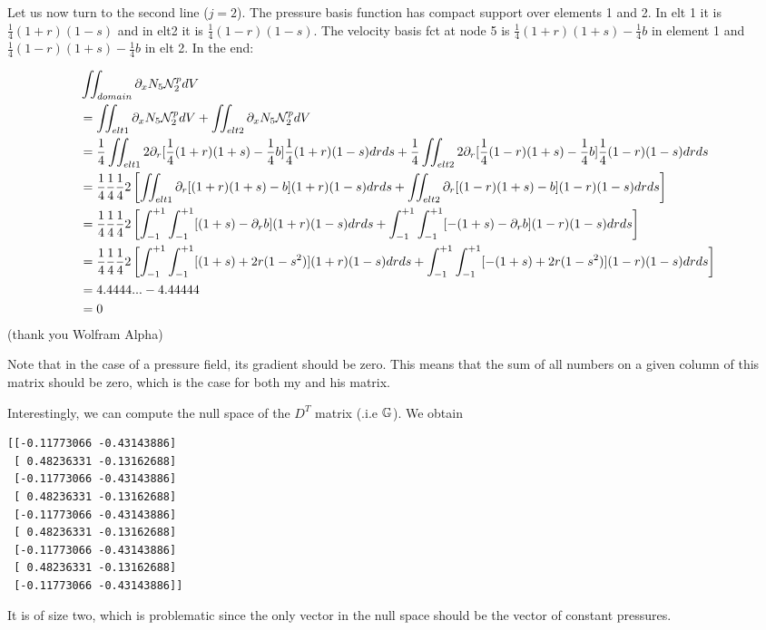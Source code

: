 Let us now turn to the second line ($j=2$). The pressure basis function has compact support
over elements 1 and 2. In elt 1 it is $\frac14(1+r)(1-s)$ and in elt2 it is $\frac14(1-r)(1-s)$.
The velocity basis fct at node 5 is $\frac14(1+r)(1+s)-\frac14 b$ in element 1 and 
$\frac14(1-r)(1+s) -\frac14 b$ in elt 2. In the end:

\begin{align}
&\iint_{domain} \partial_x N_5 {\mathcal{N}}_2^p dV \nonumber\\
&= \iint_{elt1} \partial_x N_5 {\mathcal{N}}_2^p dV + \iint_{elt2} \partial_x N_5 {\mathcal{N}}_2^p dV \nonumber\\
&= 
\frac14 \iint_{elt1} 2\partial_r [\frac14(1+r)(1+s)-\frac14 b] \frac14(1+r)(1-s) drds +
\frac14 \iint_{elt2} 2\partial_r [\frac14(1-r)(1+s)-\frac14 b] \frac14(1-r)(1-s) drds \nonumber\\
&=
\frac14\frac14\frac14 2 
\left[ 
\iint_{elt1} \partial_r [(1+r)(1+s)-b] (1+r)(1-s) drds +
\iint_{elt2} \partial_r [(1-r)(1+s)-b] (1-r)(1-s) drds 
\right] \nonumber\\
&=
\frac14\frac14\frac14 2 
\left[ 
\int_{-1}^{+1} \int_{-1}^{+1}  [ (1+s)-\partial_r b] (1+r)(1-s) drds +
\int_{-1}^{+1} \int_{-1}^{+1}  [-(1+s)-\partial_r b] (1-r)(1-s) drds 
\right] \nonumber\\
&= 
\frac14\frac14\frac14 2 
\left[ 
\int_{-1}^{+1} \int_{-1}^{+1}  [ (1+s) +2r(1-s^2)] (1+r)(1-s) drds +
\int_{-1}^{+1} \int_{-1}^{+1}  [-(1+s) +2r(1-s^2)] (1-r)(1-s) drds
\right] \nonumber\\ 
&= 4.4444... -4.44444 \nonumber\\ 
&= 0
\end{align}
(thank you Wolfram Alpha)


Note that in the case of a pressure field, its gradient should be zero. 
This means that the sum of all numbers on a given column of this matrix 
should be zero, which is the case for both my and his matrix.

Interestingly, we can compute the null space of the $D^T$ matrix (.i.e ${\mathbb{G}}$).
We obtain
\begin{verbatim}
[[-0.11773066 -0.43143886]
 [ 0.48236331 -0.13162688]
 [-0.11773066 -0.43143886]
 [ 0.48236331 -0.13162688]
 [-0.11773066 -0.43143886]
 [ 0.48236331 -0.13162688]
 [-0.11773066 -0.43143886]
 [ 0.48236331 -0.13162688]
 [-0.11773066 -0.43143886]]
\end{verbatim}
It is of size two, which is problematic since the only vector in the 
null space should be the vector of constant pressures.

